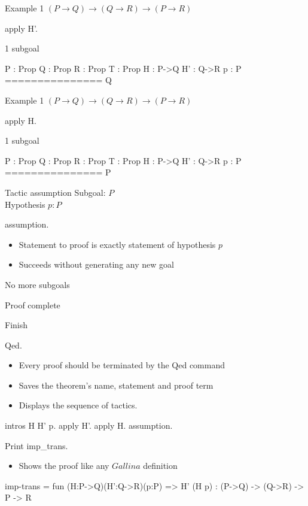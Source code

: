 \begin{frame}[fragile]{Example 1}
	$(P \rightarrow Q) \rightarrow (Q \rightarrow R) \rightarrow (P \rightarrow R)$
	\pause
	\begin{user}
		apply H'.
	\end{user}
	\pause
	\begin{coq}
		1 subgoal

		P : Prop
		Q : Prop
		R : Prop
		T : Prop
		H : P->Q
		H' : Q->R
		p : P
		===============
		 Q
	\end{coq}
\end{frame}
\begin{frame}[fragile]{Example 1}
	$(P \rightarrow Q) \rightarrow (Q \rightarrow R) \rightarrow (P \rightarrow R)$
	\pause
	\begin{user}
		apply H.
	\end{user}
	\pause
	\begin{coq}
		1 subgoal

		P : Prop
		Q : Prop
		R : Prop
		T : Prop
		H : P->Q
		H' : Q->R
		p : P
		===============
		 P
	\end{coq}
\end{frame}
\begin{frame}[fragile]{Tactic assumption}
	Subgoal: $P$\\
	\medskip
	Hypothesis $p: P$
	\medskip
	\pause
	\begin{user}
		assumption.
	\end{user}
	\begin{itemize}
		\item Statement to proof is exactly statement of hypothesis $p$
		\pause
		\item Succeeds without generating any new goal
	\end{itemize}
	\pause
	\medskip
	\begin{coq}
	No more subgoals
	\end{coq}
	\pause
	Proof complete
\end{frame}
\begin{frame}[fragile]{Finish}
	\begin{user}
	Qed.
	\end{user}
	\pause
	\begin{itemize}
		\item Every proof should be terminated by the Qed command
		\pause
		\item Saves the theorem's name, statement and proof term
		\pause
		\item Displays the sequence of tactics.
	\end{itemize}
	\begin{coq}
		intros H H' p.
		apply H'.
		apply H.
		assumption.
	\end{coq}
	\pause
	\medskip
	\begin{user}
		Print imp_trans.
	\end{user}
	\pause
	\begin{itemize}
		\item Shows the proof like any $Gallina$ definition
	\end{itemize}
	\begin{coq}
		imp-trans = fun (H:P->Q)(H':Q->R)(p:P) => H' (H p)
		 : (P->Q) -> (Q->R) -> P -> R
	\end{coq}
\end{frame}
